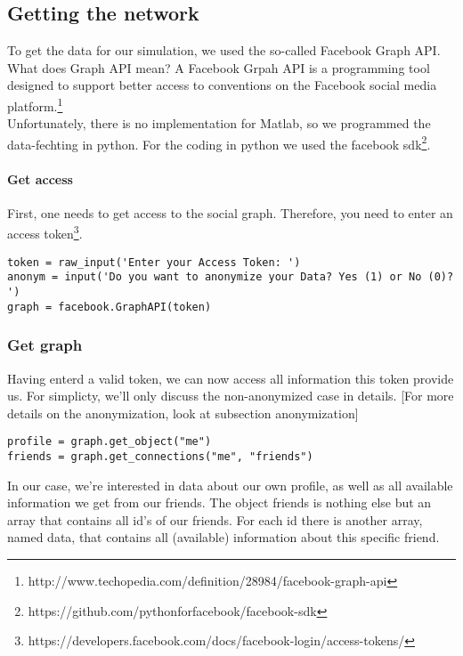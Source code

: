 
\subsection{Getting the network} 

To get the data for our simulation, we used the so-called Facebook Graph API. What does Graph API mean? 
A Facebook Grpah API is a programming tool designed to support better access to conventions on the Facebook social media platform.\footnote{http://www.techopedia.com/definition/28984/facebook-graph-api} 
\\
Unfortunately, there is no implementation for Matlab, so we programmed the data-fechting in python. For the coding in python we used the facebook sdk\footnote{https://github.com/pythonforfacebook/facebook-sdk}. 

\paragraph{Get access}

First, one needs to get access to the social graph. Therefore, you need to enter an access token\footnote{https://developers.facebook.com/docs/facebook-login/access-tokens/}. 

\begin{lstlisting} 
token = raw_input('Enter your Access Token: ')
anonym = input('Do you want to anonymize your Data? Yes (1) or No (0)? ')
graph = facebook.GraphAPI(token)

\end{lstlisting}

\subsubsection{Get graph}

Having enterd a valid token, we can now access all information this token provide us.  For simplicty, we'll only discuss  the non-anonymized case in details. [For more details on the anonymization, look at subsection anonymization]

\begin{lstlisting} 
profile = graph.get_object("me")
friends = graph.get_connections("me", "friends")
\end{lstlisting}

In our case, we're interested in data about our own profile, as well as all available information we get from our friends.
The object friends is nothing else but an array that contains all id's of our friends. For each id there is another array, named data, that contains all (available) information about this specific friend.  

